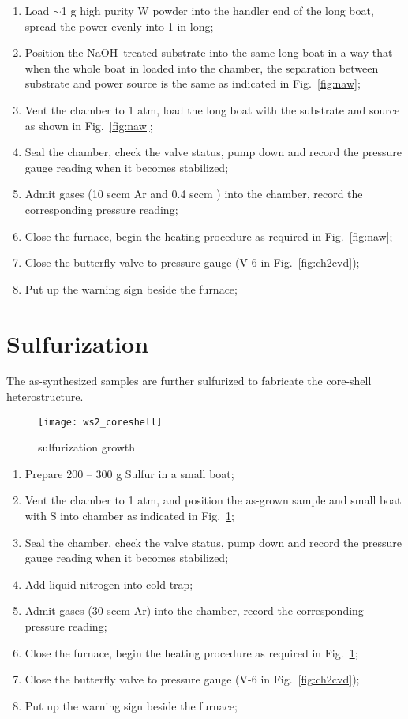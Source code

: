 \begin{enumerate}
\item Load $\sim$1 g high purity W powder into the handler end of the long boat, spread the power evenly into 1 in long;
\item Position the NaOH--treated substrate into the same long boat in a way that when the whole boat in loaded into the chamber, the separation between substrate and power source is the same as indicated in Fig.~\ref{fig:naw};
\item Vent the chamber to 1 atm, load the long boat with the substrate and source as shown in Fig.~\ref{fig:naw};
\item Seal the chamber, check the valve status, pump down and record the pressure gauge reading when it becomes stabilized; 
\item Admit gases (10 sccm Ar and 0.4 sccm ) into the chamber, record the corresponding pressure reading;
\item Close the furnace, begin the heating procedure as required in Fig.~\ref{fig:naw}; 
\item Close the butterfly valve to pressure gauge (V-6 in Fig.~\ref{fig:ch2cvd});
\item Put up the warning sign beside the furnace;
\end{enumerate}

\section{Sulfurization}

The as-synthesized  samples are further sulfurized to fabricate the core-shell heterostructure. 

\begin{figure}[htb]
\centering
\texttt{[image: ws2\_coreshell]}
\caption{ sulfurization growth}
\label{fig:suf}
\end{figure}

\begin{enumerate}
\item Prepare 200 -- 300 g Sulfur in a small boat;
\item Vent the chamber to 1 atm, and position the as-grown  sample and small boat with S into chamber as indicated in Fig.~\ref{fig:suf};
\item Seal the chamber, check the valve status, pump down and record the pressure gauge reading when it becomes stabilized; 
\item Add liquid nitrogen into cold trap; 
\item Admit gases (30 sccm Ar) into the chamber, record the corresponding pressure reading;
\item Close the furnace, begin the heating procedure as required in Fig.~\ref{fig:suf}; 
\item Close the butterfly valve to pressure gauge (V-6 in Fig.~\ref{fig:ch2cvd});
\item Put up the warning sign beside the furnace;
\end{enumerate}


